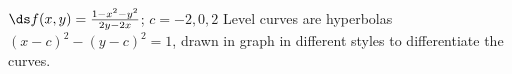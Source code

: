 {$\ds f(x,y) = \frac{1-x^2-y^2}{2y-2x}$; $c = -2,0,2$}
{Level curves are hyperbolas $(x-c)^2-(y-c)^2=1$, drawn in graph in different styles to differentiate the curves.\\
}